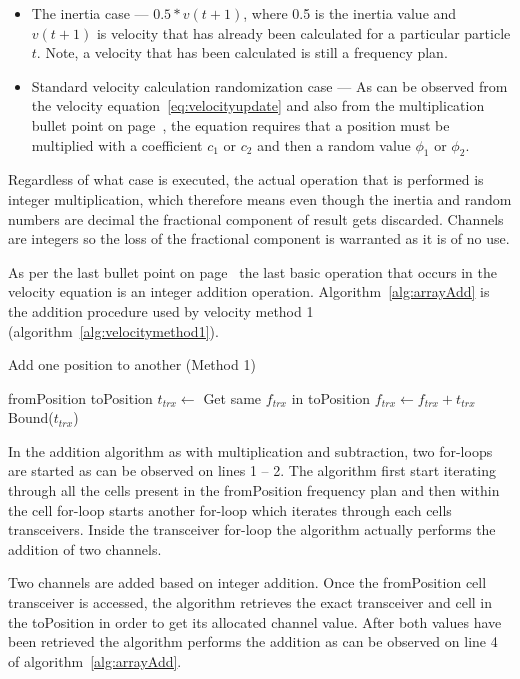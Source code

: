 \begin{itemize}
\item The inertia case --- $0.5 * v(t+1)$, where 0.5 is the inertia value and $v(t+1)$ is velocity that has already been calculated for a particular particle $t$. Note, a velocity that has been calculated is still a frequency plan.
\item Standard velocity calculation randomization case --- As can be observed from the velocity equation~\ref{eq:velocityupdate} and also from the multiplication bullet point on page~\pageref{lst:velocitybreakup}, the equation requires that a position must be multiplied with a coefficient $c_1$ or $c_2$ and then a random value $\phi_1$ or $\phi_2$. 
\end{itemize}

Regardless of what case is executed, the actual operation that is performed is integer multiplication, which therefore means even though the inertia and random numbers are decimal the fractional component of result gets discarded. Channels are integers so the loss of the fractional component is warranted as it is of no use.

As per the last bullet point on page~\pageref{lst:velocitybreakup} the last basic operation that occurs in the velocity equation is an integer addition operation. Algorithm~\ref{alg:arrayAdd} is the addition procedure used by velocity method 1 (algorithm~\ref{alg:velocitymethod1}).
\begin{algorithm}
\caption{Add one position to another (Method 1)}
\label{alg:arrayAdd}
\begin{algorithmic}[1]
	\REQUIRE fromPosition
	\REQUIRE toPosition
			\STATE $t_{trx} \leftarrow$ Get same $f_{trx}$ in toPosition
			\STATE $f_{trx} \leftarrow f_{trx} + t_{trx}$
			\STATE Bound($t_{trx}$)
		\ENDFOR
	\ENDFOR
\end{algorithmic}
\end{algorithm}

In the addition algorithm as with multiplication and subtraction, two for-loops are started as can be observed on lines 1 -- 2. The algorithm first start iterating through all the cells present in the fromPosition frequency plan and then within the cell for-loop starts another for-loop which iterates through each cells transceivers. Inside the transceiver for-loop the algorithm actually performs the addition of two channels.

Two channels are added based on integer addition. Once the fromPosition cell transceiver is accessed, the algorithm retrieves the exact transceiver and cell in the toPosition in order to get its allocated channel value. After both values have been retrieved the algorithm performs the addition as can be observed on line 4 of algorithm~\ref{alg:arrayAdd}.

